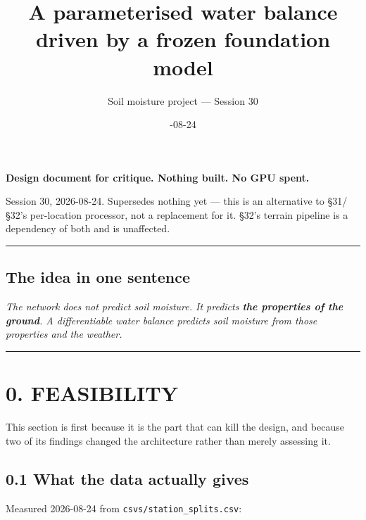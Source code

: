 \documentclass[10pt,a4paper]{article}
\title{\bfseries\sffamily A parameterised water balance\\driven by a frozen foundation model}
\author{\sffamily Soil moisture project --- Session 30}
\date{\sffamily 2026-08-24}
\newenvironment{quoting}%
  {\begin{list}{}{\setlength{\leftmargin}{1.4em}\setlength{\rightmargin}{1.4em}%
   \setlength{\topsep}{5pt}}\item[]\itshape}%
  {\end{list}}
\begin{document}
\maketitle
\thispagestyle{fancy}
{\small\tableofcontents}
\clearpage

\textbf{Design document for critique. Nothing built. No GPU spent.}

Session 30, 2026-08-24. Supersedes nothing yet — this is an alternative to
§31/§32's per-location processor, not a replacement for it. §32's terrain
pipeline is a dependency of both and is unaffected.

\medskip\hrule\medskip

\subsection*{The idea in one sentence}

\begin{quoting}
The network does not predict soil moisture. It predicts \textbf{the properties of the ground}. A differentiable water balance predicts soil moisture from those properties and the weather.
\end{quoting}

\medskip\hrule\medskip

\section*{0. FEASIBILITY}

This section is first because it is the part that can kill the design, and
because two of its findings changed the architecture rather than merely
assessing it.

\subsection*{0.1 What the data actually gives}

Measured 2026-08-24 from \texttt{csvs/station\_splits.csv}:
\end{document}
